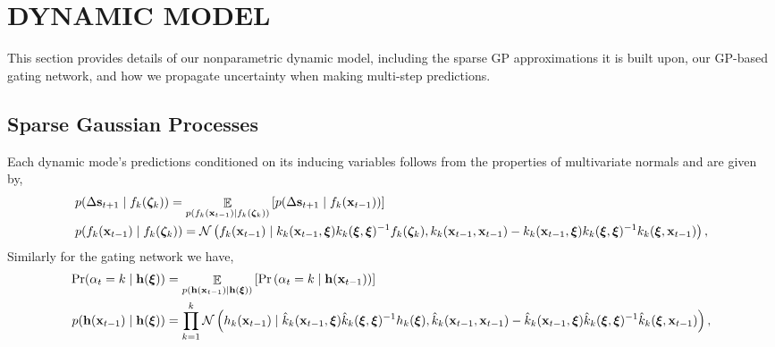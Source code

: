 \documentclass[twoside]{article}
\DeclareMathOperator{\E}{\mathbb{E}}
\newcommand{\numData}{\ensuremath{t}}
\newcommand{\modeInd}{\ensuremath{k}}
\newcommand{\ModeInd}{\ensuremath{\MakeUppercase{\modeInd}}}
\newcommand{\mode}[1]{\ensuremath{#1_{\modeInd}}}
\newcommand{\x}{\ensuremath{\mathbf{x}}}
\newcommand{\singleInput}{\ensuremath{\x_{\numData-1}}}
\newcommand{\gatingFunc}{\ensuremath{h}}
\newcommand{\latentFunc}{\ensuremath{f}}
\begin{document}
\section{DYNAMIC MODEL \label{sec-dynamics}}
\label{sec:org5cbcd4b}
This section provides details of our nonparametric dynamic model, including the sparse GP approximations it is
built upon, our GP-based gating network, and how we propagate uncertainty when making multi-step predictions.

\subsection{Sparse Gaussian Processes \label{sec-sparse-approximations}}
\label{sec:orga71e2ee}
Each dynamic mode's predictions conditioned on its inducing variables follows from the properties of multivariate normals
and are given by,
\begin{subequations}  \label{eq-sparse-gp-methodologies}
\begin{align}
&\singleExpertGivenInducing = \E_{\singleLatentExpertGivenInducing} \left[ \singleExpertLikelihood \right] \\
&\singleLatentExpertGivenInducing = \mathcal{N}\left( \mode{\latentFunc}(\singleInput) \mid
\expertKernelnM \expertKernelMM^{-1} \expertInducingOutput,
\expertKernelnn - \expertKernelnM \expertKernelMM^{-1} \expertKernelMn \right),
\end{align}
\end{subequations}
Similarly for the gating network we have,
\begin{subequations} \label{eq-sparse-gp-methodologies-gating}
\begin{align}
\singleGatingGivenInducing &= \E_{\singleLatentGatingsGivenInducing} \left[ \singleGatingLikelihood \right] \\
\singleLatentGatingsGivenInducing &= \prod_{\modeInd=1}^{\ModeInd} \mathcal{N}\left( \mode{\gatingFunc}(\singleInput) \mid
\gatingKernelnM \gatingKernelMM^{-1} \gatingInducingOutput,
\gatingKernelnn - \gatingKernelnM \gatingKernelMM^{-1} \gatingKernelMn \right),
\end{align}
\end{subequations}
\end{document}
